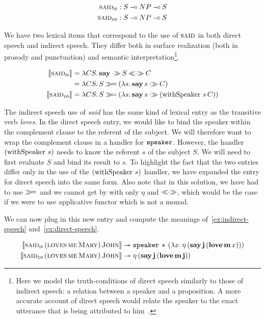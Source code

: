 \begin{align*}
  \textsc{said}_{\textsc{is}} &: S \mathbin{{-}\mkern-3.5mu{\circ}} NP \mathbin{{-}\mkern-3.5mu{\circ}} S \\
  \textsc{said}_{\textsc{ds}} &: S \mathbin{{-}\mkern-3.5mu{\circ}} NP \mathbin{{-}\mkern-3.5mu{\circ}} S
\end{align*}

We have two lexical items that correspond to the use of $\textsc{said}$ in
both direct speech and indirect speech. They differ both in surface
realization (both in prosody and punctuation) and semantic
interpretation\footnote{Here we model the truth-conditions of direct speech
  similarly to those of indirect speech: a relation between a speaker and a
  proposition. A more accurate account of direct speech would relate the
  speaker to the exact utterance that is being attributed to
  him~\cite{shan2010character}.
}.

\begin{align*}
  \sem{\abs{said}_{\abs{is}}} &= \lam{C S}{\obj{say} \apr S \aplr C} \\
  &= \lam{C S}{S \hsbind (\lam{s}{\ap{\obj{say}}{s} \apr C})} \\
  \sem{\abs{said}_{\abs{ds}}}
  &= \lam{C S}{S \hsbind (\lam{s}{\ap{\obj{say}}{s} \apr (\app{\withSpeaker}{s}{C})})}
\end{align*}

The indirect speech use of \emph{said} has the same kind of lexical entry
as the transitive verb \emph{loves}. In the direct speech entry, we would
like to bind the speaker within the complement clause to the referent of
the subject. We will therefore want to wrap the complement clause in a
handler for $\mathtt{speaker}$. However, the handler $(\operatorname{withSpeaker}\,s)$
needs to know the referent $s$ of the subject $S$. We will need to first
evaluate $S$ and bind its result to $s$. To highlight the fact that the two
entries differ only in the use of the $(\operatorname{withSpeaker}\,s)$ handler, we
have expanded the entry for direct speech into the same form. Also note
that in this solution, we have had to use $\mathbin{\gg\!=}$ and we cannot get by
with only $\eta$ and $\mathbin{\ll\!\!\cdot\!\!\gg}$, which would be the case if we were to use
applicative functor which is not a monad.

We can now plug in this new entry and compute the meanings
of~\eqref{ex:indirect-speech} and~\eqref{ex:direct-speech}.

\NoChapterPrefix
\begin{align}
  \llbracket \textsc{said}_{\textsc{is}}\,(\textsc{loves}\,\textsc{me}\,\textsc{Mary})\,\textsc{John} \rrbracket
  & \twoheadrightarrow \mathtt{speaker}\,\star\,(\lambda x.\, \eta\,(\textbf{say}\,\textbf{j}\,(\textbf{love}\,\textbf{m}\,x))) \\
  \llbracket \textsc{said}_{\textsc{ds}}\,(\textsc{loves}\,\textsc{me}\,\textsc{Mary})\,\textsc{John} \rrbracket
  & \twoheadrightarrow \eta\,(\textbf{say}\,\textbf{j}\,(\textbf{love}\,\textbf{m}\,\textbf{j}))
\end{align}
\ChapterPrefix

